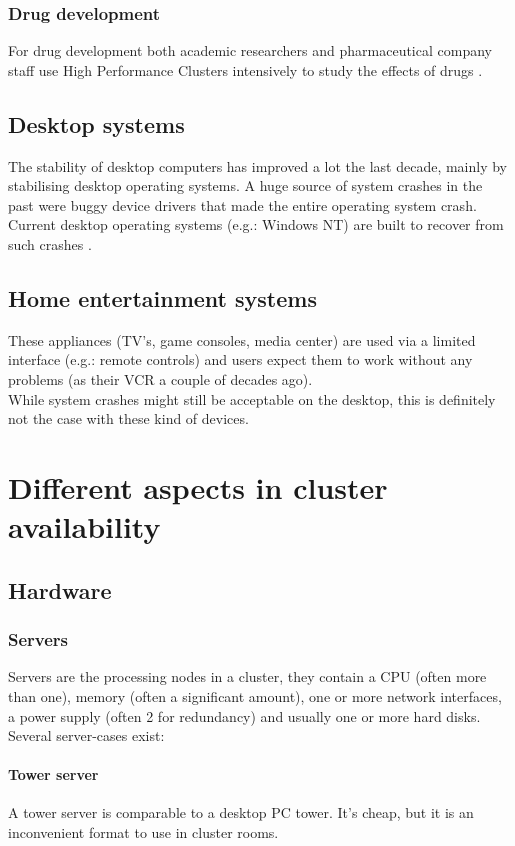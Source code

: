 \documentclass[12pt]{report}
\begin{document}
\subsection{Drug development}
For drug development both
academic researchers and pharmaceutical company staff use High
Performance Clusters intensively to study the effects of drugs
\cite{deforche2007bayesian} \cite{lengauer2006bioinformatics}.

\section{Desktop systems}
The stability of desktop computers has improved a lot the last decade,
mainly by stabilising desktop operating systems. A huge source of system
crashes in the past were buggy device drivers that made the entire
operating system crash.
Current desktop operating systems
(e.g.: Windows NT) are built to recover from such crashes
\cite{windows_nt_kernel}.

\section{Home entertainment systems}
These appliances (TV's, game consoles, media center) are used via a limited interface (e.g.:
remote controls) and users expect them to work without any problems
(as their VCR a  couple of decades ago).\\
While system crashes might still be acceptable on the desktop, this is
definitely not the case with these kind of devices. 


\chapter{Different aspects in cluster availability}
\label{chap:aspects}
\section{Hardware}
\subsection{Servers}
Servers are the processing nodes in a cluster, they contain a CPU
(often more than one), memory (often a significant amount), one or
more network interfaces, a power supply (often 2 for redundancy) and
usually one or more hard disks.\\
Several server-cases exist:
\subsubsection{Tower server} 
A tower server is comparable to a desktop PC tower. It's cheap, but it is
  an inconvenient format to use in cluster rooms.
\end{document}
